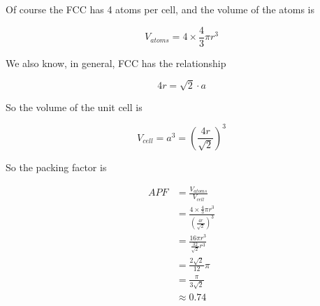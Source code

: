 \documentclass{article}
\begin{document}
Of course the FCC has 4 atoms per cell, and the volume of the atoms is

\[
    V_{atoms} = 4 \times \frac{4}{3} \pi r^3
\]

We also know, in general, FCC has the relationship

\[
    4r = \sqrt{2} \cdot a
\]

So the volume of the unit cell is

\[
    V_{cell} = a^3 = \left( \frac{4r}{\sqrt{2}} \right)^3
\]

So the packing factor is

\begin{align*}
    APF &= \frac{V_{atoms}}{V_{cell}} \\
    &= \frac{4 \times \frac{4}{3} \pi r^3}{\left( \frac{4r}{\sqrt{2}} \right)^3} \\
    &= \frac{16\pi r^3}{\frac{32}{\sqrt{2}} r^3} \\
    &= \frac{2\sqrt{2}}{12} \pi \\
    &= \frac{\pi}{3\sqrt{2}} \\
    &\approx 0.74
\end{align*}
\end{document}

